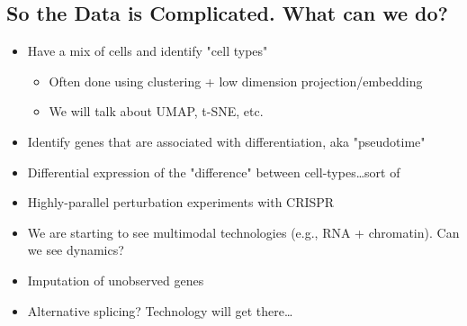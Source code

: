 \documentclass[10pt]{article}
\begin{document}
\subsection*{So the Data is Complicated.  What can we do?}
\begin{itemize} 
    \item Have a mix of cells and identify "cell types"
    \begin{itemize}
        \item Often done using clustering + low dimension projection/embedding
        \item We will talk about UMAP, t-SNE, etc.
    \end{itemize}
    \item Identify genes that are associated with differentiation, aka "pseudotime"
    \item Differential expression of the "difference" between cell-types\dots sort of ~
    \item Highly-parallel perturbation experiments with CRISPR
    \item We are starting to see multimodal technologies (e.g., RNA + chromatin).  Can we see dynamics?
    \item Imputation of unobserved genes
    \item Alternative splicing?  Technology will get there\dots
\end{itemize}
\end{document}
